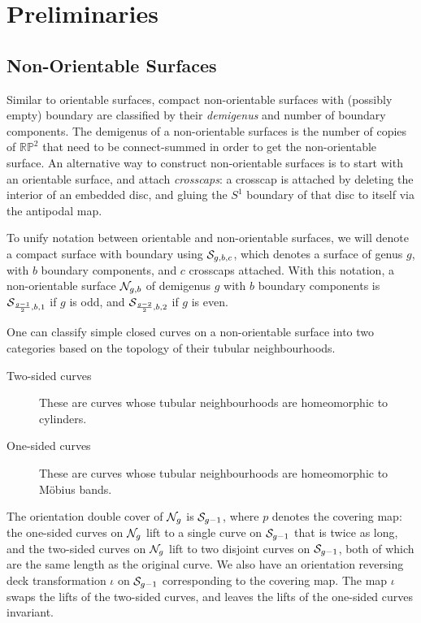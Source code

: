 \section{Preliminaries}
\label{sec:preliminaries}

\subsection{Non-Orientable Surfaces}
\label{sec:non-orient-surf}

Similar to orientable surfaces, compact non-orientable surfaces with (possibly empty) boundary are classified by their \emph{demigenus} and number of boundary components.
The demigenus of a non-orientable surfaces is the number of copies of $\mathbb{RP}^2$ that need to be connect-summed in order to get the non-orientable surface.
An alternative way to construct non-orientable surfaces is to start with an orientable surface, and attach \emph{crosscaps}: a crosscap is attached by deleting the interior of an embedded disc, and gluing the $S^1$ boundary of that disc to itself via the antipodal map.

To unify notation between orientable and non-orientable surfaces, we will denote a compact surface with boundary using $\mathcal{S}_{g,b,c}$, which denotes a surface of genus $g$, with $b$ boundary components, and $c$ crosscaps attached.
With this notation, a non-orientable surface $\mathcal{N}_{g, b}$ of demigenus $g$ with $b$ boundary components is $\mathcal{S}_{\frac{g-1}{2}, b, 1}$ if $g$ is odd, and $\mathcal{S}_{\frac{g-2}{2}, b, 2}$ if $g$ is even.

One can classify simple closed curves on a non-orientable surface into two categories based on the topology of their tubular neighbourhoods.
\begin{description}
\item[Two-sided curves] These are curves whose tubular neighbourhoods are homeomorphic to cylinders.
\item[One-sided curves] These are curves whose tubular neighbourhoods are homeomorphic to Möbius bands.
\end{description}

The orientation double cover of $\mathcal{N}_g$ is $\mathcal{S}_{g-1}$, where $p$ denotes the covering map: the one-sided curves on $\mathcal{N}_g$ lift to a single curve on $\mathcal{S}_{g-1}$ that is twice as long, and the two-sided curves on $\mathcal{N}_g$ lift to two disjoint curves on $\mathcal{S}_{g-1}$, both of which are the same length as the original curve.
We also have an orientation reversing deck transformation $\iota$ on $\mathcal{S}_{g-1}$ corresponding to the covering map.
The map $\iota$ swaps the lifts of the two-sided curves, and leaves the lifts of the one-sided curves invariant.

